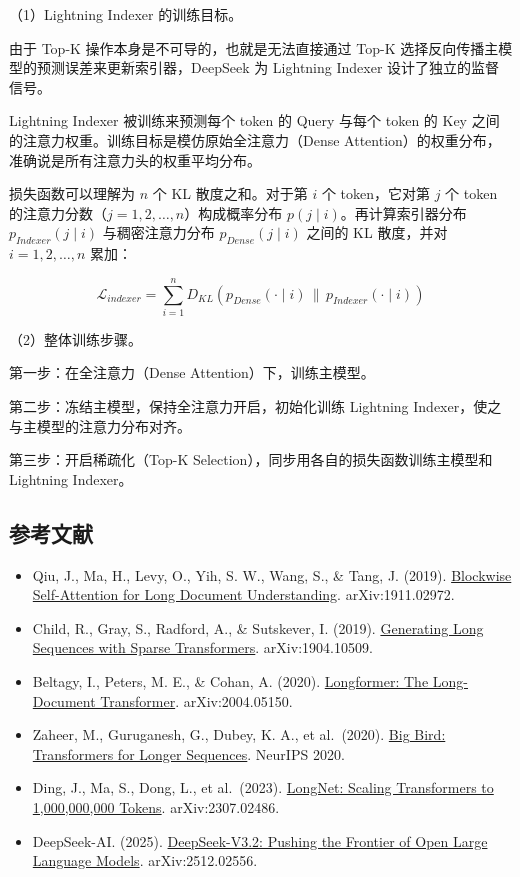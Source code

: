 （1）Lightning Indexer 的训练目标。

由于 Top-K 操作本身是不可导的，也就是无法直接通过 Top-K 选择反向传播主模型的预测误差来更新索引器，DeepSeek 为 Lightning Indexer 设计了独立的监督信号。

Lightning Indexer 被训练来预测每个 token 的 Query 与每个 token 的 Key 之间的注意力权重。训练目标是模仿原始全注意力（Dense Attention）的权重分布，准确说是所有注意力头的权重平均分布。

损失函数可以理解为 \(n\) 个 KL 散度之和。对于第 \(i\) 个 token，它对第 \(j\) 个 token 的注意力分数（\(j = 1, 2, \ldots, n\)）构成概率分布 \(p(j \mid i)\)。再计算索引器分布 \(p_{Indexer}(j \mid i)\) 与稠密注意力分布 \(p_{Dense}(j \mid i)\) 之间的 KL 散度，并对 \(i = 1, 2, \ldots, n\) 累加：

\[
\mathcal{L}_{indexer}
= \sum_{i=1}^{n} D_{KL}\left(p_{Dense}(\cdot \mid i) \,\|\, p_{Indexer}(\cdot \mid i)\right)
\]

（2）整体训练步骤。

第一步：在全注意力（Dense Attention）下，训练主模型。

第二步：冻结主模型，保持全注意力开启，初始化训练 Lightning Indexer，使之与主模型的注意力分布对齐。

第三步：开启稀疏化（Top-K Selection），同步用各自的损失函数训练主模型和 Lightning Indexer。

\hypertarget{ux53c2ux8003ux6587ux732e-97}{%
\subsection{参考文献}\label{ux53c2ux8003ux6587ux732e-97}}

\vspace{0.25em}
\begin{itemize}
\tightlist
\item
  Qiu, J., Ma, H., Levy, O., Yih, S. W., Wang, S., \& Tang, J. (2019). \href{https://arxiv.org/abs/1911.02972}{Blockwise Self-Attention for Long Document Understanding}. arXiv:1911.02972.
\item
  Child, R., Gray, S., Radford, A., \& Sutskever, I. (2019). \href{https://arxiv.org/abs/1904.10509}{Generating Long Sequences with Sparse Transformers}. arXiv:1904.10509.
\item
  Beltagy, I., Peters, M. E., \& Cohan, A. (2020). \href{https://arxiv.org/abs/2004.05150}{Longformer: The Long-Document Transformer}. arXiv:2004.05150.
\item
  Zaheer, M., Guruganesh, G., Dubey, K. A., et al.~(2020). \href{https://arxiv.org/abs/2007.14062}{Big Bird: Transformers for Longer Sequences}. NeurIPS 2020.
\item
  Ding, J., Ma, S., Dong, L., et al.~(2023). \href{https://arxiv.org/abs/2307.02486}{LongNet: Scaling Transformers to 1,000,000,000 Tokens}. arXiv:2307.02486.
\item
  DeepSeek-AI. (2025). \href{https://arxiv.org/abs/2512.02556}{DeepSeek-V3.2: Pushing the Frontier of Open Large Language Models}. arXiv:2512.02556.
\end{itemize}

